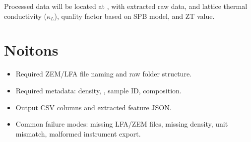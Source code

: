 Processed data will be located at , with extracted raw data, and lattice thermal conductivity ($\kappa_L$), 
quality factor based on SPB model, and ZT value.

\section{Noitons}

\begin{itemize}[leftmargin=*]
  \item Required ZEM/LFA file naming and raw folder structure.
  \item Required metadata: density, , sample ID, composition.
  \item Output CSV columns and extracted feature JSON.
  \item Common failure modes: missing LFA/ZEM files, missing density, unit
  mismatch, malformed instrument export.
\end{itemize}
